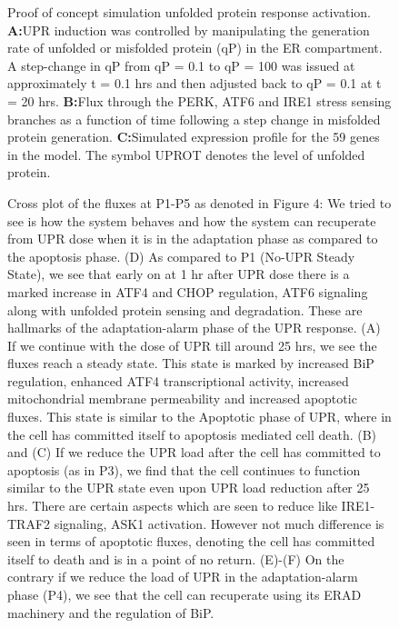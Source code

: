 \begin{figure}\centering
{}
	\caption{Proof of concept simulation unfolded protein response activation. 
	\textbf{A:}UPR induction was controlled by manipulating the generation rate of unfolded or misfolded protein (qP) in the ER compartment. A step-change in qP from qP = 0.1 to qP = 100 was issued at approximately t = 0.1 hrs and then adjusted back to qP = 0.1 at t = 20 hrs.
	\textbf{B:}Flux through the PERK, ATF6 and IRE1 stress sensing branches as a function of time following a step change in misfolded protein generation.
	\textbf{C:}Simulated expression profile for the 59 genes in the model. The symbol UPROT denotes the level of unfolded protein.}
	\label{fg:proof_of_concept_simulation}
\end{figure}

\begin{figure}\centering
{}
	\caption{Cross plot of the fluxes at P1-P5 as denoted in Figure 4: We tried to see is how the system behaves and how the system can recuperate from UPR dose when it is in the adaptation phase as compared to the apoptosis phase. (D) As compared to P1 (No-UPR Steady State), we see that early on at 1 hr after UPR dose there is a marked increase in ATF4 and CHOP regulation, ATF6 signaling along with unfolded protein sensing and degradation. These are hallmarks of the adaptation-alarm phase of the UPR response. (A) If we continue with the dose of UPR till around 25 hrs, we see the fluxes reach a steady state. This state is marked by increased BiP regulation, enhanced ATF4 transcriptional activity, increased mitochondrial membrane permeability and increased apoptotic fluxes. This state is similar to the Apoptotic phase of UPR, where in the cell has committed itself to apoptosis mediated cell death. (B) and (C) If we reduce the UPR load after the cell has committed to apoptosis (as in P3), we find that the cell continues to function similar to the UPR state even upon UPR load reduction after 25 hrs. There are certain aspects which are seen to reduce like IRE1-TRAF2 signaling, ASK1 activation. However not much difference is seen in terms of apoptotic fluxes, denoting the cell has committed itself to death and is in a point of no return. (E)-(F) On the contrary if we reduce the load of UPR in the adaptation-alarm phase (P4), we see that the cell can recuperate using its ERAD machinery and the regulation of BiP.}
	\label{fg:cross_plot_flux}
\end{figure}

